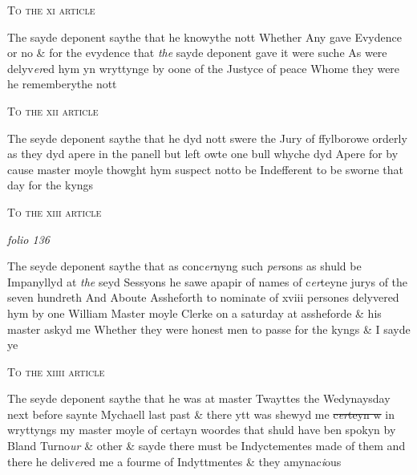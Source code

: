 \documentclass[12pt, a4paper]{book}
\begin{document}
            		
				\begin{center}  {\scshape To the xi article}  \end{center}
			
            		
		\ifthenelse{\isodd{\thepage}}
		{\reversemarginpar}
		{\normalmarginpar}
		The sayde deponent saythe that he knowythe nott Whether Any gave Evydence or no \& for the evydence that \textit{the }sayde deponent gave it were suche As were delyv\textit{er}ed hym yn wryttynge by oone of the Justyce of peace Whome they were he rememberythe nott
            		
				\begin{center}  {\scshape To the xii article}  \end{center}
			
            			
		\ifthenelse{\isodd{\thepage}}
		{\reversemarginpar}
		{\normalmarginpar}
		The seyde deponent saythe that he dyd nott swere the Jury of ffylborowe orderly as they dyd apere in the panell but left owte one bull whyche dyd Apere for by cause master moyle thowght hym suspect notto be Indefferent to be sworne that day for the kyngs
            		
            		
				\begin{center}  {\scshape To the xiii article}  \end{center}
			

\dotfill
						\newpage
{}

\textit{folio 136}


 	
		\ifthenelse{\isodd{\thepage}}
		{\reversemarginpar}
		{\normalmarginpar}
		The seyde deponent saythe that as conc\textit{er}nyng such \textit{per}sons as shuld be Impanyllyd at \textit{the} seyd Sessyons he sawe apapir of  names of c\textit{er}teyne jurys of the seven hundreth And Aboute Assheforth to nominate of xviii persones
			 delyvered hym by one William Master moyle Clerke on a saturday at assheforde
			 \& his master askyd me Whether they were honest men to passe for the kyngs \& I sayde ye
 	
				\begin{center}  {\scshape To the xiiii article}  \end{center}
			
 		
		\ifthenelse{\isodd{\thepage}}
		{\reversemarginpar}
		{\normalmarginpar}
		The seyde deponent saythe that he was at master Twayttes the Wedynaysday next before saynte Mychaell last past \& there ytt was shewyd me \sout{c\textit{er}teyn w }in wryttyngs my master moyle of certayn woordes that shuld have ben spokyn by Bland Turno\textit{ur} \& other \& sayde there must be Indyctementes made of them and there he deliv\textit{er}ed me a fourme of Indyttmentes \& they amynac\textit{i}ous 
 	
\end{document}
